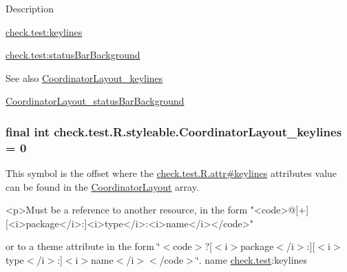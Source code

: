 Description 

{\ttfamily \hyperlink{classcheck_1_1test_1_1_r_1_1styleable_ace4f3ed32729fc65e4cdaae8db4dc51e}{check.\+test\+:keylines}}

{\ttfamily \hyperlink{classcheck_1_1test_1_1_r_1_1styleable_ad1fdf005500041f1c7352b0934313c58}{check.\+test\+:status\+Bar\+Background}}

\begin{DoxySeeAlso}{See also}
\hyperlink{classcheck_1_1test_1_1_r_1_1styleable_ace4f3ed32729fc65e4cdaae8db4dc51e}{Coordinator\+Layout\+\_\+keylines} 

\hyperlink{classcheck_1_1test_1_1_r_1_1styleable_ad1fdf005500041f1c7352b0934313c58}{Coordinator\+Layout\+\_\+status\+Bar\+Background} 
\end{DoxySeeAlso}
\hypertarget{classcheck_1_1test_1_1_r_1_1styleable_ace4f3ed32729fc65e4cdaae8db4dc51e}{}
\subsubsection[{Coordinator\+Layout\+\_\+keylines}]{\setlength{\rightskip}{0pt plus 5cm}final int check.\+test.\+R.\+styleable.\+Coordinator\+Layout\+\_\+keylines = 0\hspace{0.3cm}{\ttfamily [static]}}\label{classcheck_1_1test_1_1_r_1_1styleable_ace4f3ed32729fc65e4cdaae8db4dc51e}
This symbol is the offset where the \hyperlink{classcheck_1_1test_1_1_r_1_1attr_a3ce856b9d1ee5098ec18015926299c1b}{check.\+test.\+R.\+attr\#keylines} attribute\textquotesingle{}s value can be found in the \hyperlink{classcheck_1_1test_1_1_r_1_1styleable_af5f8b747fab6f8b93989f42f927f00fc}{Coordinator\+Layout} array.

\begin{DoxyVerb}      <p>Must be a reference to another resource, in the form "<code>@[+][<i>package</i>:]<i>type</i>:<i>name</i></code>"
\end{DoxyVerb}
 or to a theme attribute in the form \char`\"{}$<$code$>$?\mbox{[}$<$i$>$package$<$/i$>$\+:\mbox{]}\mbox{[}$<$i$>$type$<$/i$>$\+:\mbox{]}$<$i$>$name$<$/i$>$$<$/code$>$\char`\"{}.  name \hyperlink{namespacecheck_1_1test}{check.\+test}\+:keylines \hypertarget{classcheck_1_1test_1_1_r_1_1styleable_a9873c4709aad91a176af799873edc422}{}
